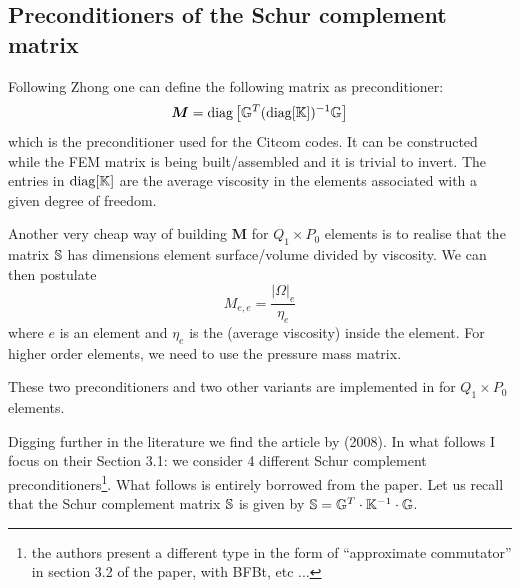 \subsection{Preconditioners of the Schur complement matrix} \label{sec:precond_S}


Following Zhong \etal \cite{zhym12} one can define the following matrix as preconditioner:
\[
{\bm M} = \text{diag} \left[ {\mathbb{G}}^T (\text{diag} [{\mathbb{K}}]  )^{-1} {\mathbb{G}} \right]
\]
which is the preconditioner used for the Citcom codes. It 
can be constructed while the FEM matrix is being built/assembled
and it is trivial to invert. The entries in
$\text{diag}[{\mathbb{K}}]$ are the average viscosity in the elements associated
with a given degree of freedom.

Another very cheap way of building ${\bm M}$ for $Q_1\times P_0$ elements 
is to realise that the matrix ${\mathbb{S}}$ has dimensions element surface/volume 
divided by viscosity. We can then postulate 
\[
M_{e,e} = \frac{|\Omega|_e}{\eta_e} 
\]
where $e$ is an element and $\eta_e$ is the (average viscosity) inside the element.
For higher order elements, we need to use the pressure mass matrix.

These two preconditioners and two other variants are implemented in  for 
$Q_1\times P_0$ elements.

Digging further in the literature we find the article by \textcite{mamo08} (2008).
In what follows I focus on their Section 3.1:  we consider 4 different Schur complement 
preconditioners\footnote{the authors present a different type in the form of ``approximate commutator''
in section 3.2 of the paper, with BFBt, etc ...}.
What follows is entirely borrowed from the paper.
Let us recall that the Schur complement matrix ${\mathbb{S}}$ is given by ${\mathbb{S}}={\mathbb{G}}^T \cdot {\mathbb{K}}^{-1} \cdot {\mathbb{G}}$.

